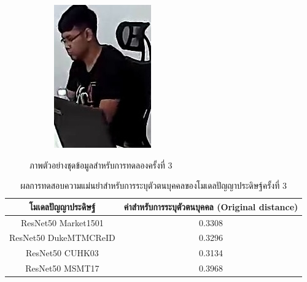 \begin{figure}[!ht]
\begin{subfigure}[b]{0.2\textwidth}
        \includegraphics[width=\textwidth]{chapter4/images/fei_1.jpg}
        \label{fig:ex_6}
    \end{subfigure}
    \caption{ภาพตัวอย่างชุดข้อมูลสำหรับการทดลองครั้งที่ 3}
    \label{fig: ภาพตัวอย่างชุดข้อมูลสำหรับการทดลอง 3}
\end{figure}
\begin{table}[!ht]
    \centering
    \begin{tabular}{|c|c|}
		\hline
		{โมเดลปัญญาประดิษฐ์}&{ค่าสำหรับการระบุตัวตนบุคคล (Original distance)}							\\
		\hline
		ResNet50 Market1501	 			& 0.3308								\\
		ResNet50 DukeMTMCReID			& 0.3296								\\
		ResNet50 CUHK03				& 0.3134								\\
		ResNet50 MSMT17				& 0.3968								\\
	\hline
    \end{tabular}
    \caption{ผลการทดสอบความแม่นยำสำหรับการระบุตัวตนบุคคลของโมเดลปัญญาประดิษฐ์ครั้งที่ 3}
    \label{tab: Original distant of image 3}
\end{table}
